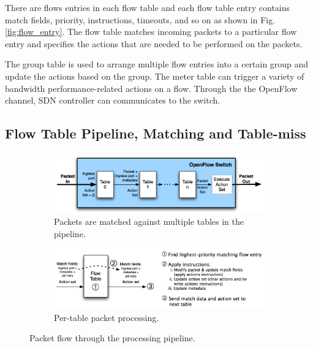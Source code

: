 There are flows entries in each flow table and each flow table entry contains match fields, priority, instructions, timeouts, and so on as shown in Fig. \ref{fig:flow_entry}.
The flow table matches incoming packets to a particular flow entry and specifies the actions that are needed to be performed on the packets.


The group table is used to arrange multiple flow entries into a certain group and update the actions based on the group. The meter table can trigger a variety of bandwidth performance-related actions on a flow. Through the the OpenFlow channel, SDN controller can communicates to the switch.



\subsection{Flow Table Pipeline, Matching and Table-miss}

\begin{figure}[!t]
  \begin{subfigure}[b]{\textwidth}
    \includegraphics[width=\textwidth]{./fig/openflow_pipeline}
    \caption{Packets are matched against multiple tables in the pipeline.}
    \label{fig:openflow_pipeline2}
  \end{subfigure}
  \hfill
  \begin{subfigure}[b]{\textwidth}
    \includegraphics[width=\textwidth]{./fig/openflow_pipeline2}
    \caption{Per-table packet processing.}
    \label{fig:openflow_pipeline3}
  \end{subfigure}
  \caption{Packet flow through the processing pipeline. \cite{openflow-spec}}
  \label{fig:openflow_pipeline}
\end{figure}


